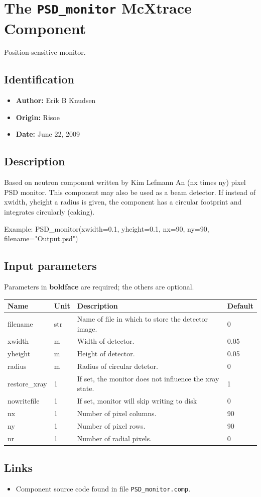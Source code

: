 \section{The \texttt{PSD\_monitor} McXtrace Component}
Position-sensitive monitor.

\subsection*{Identification}
\begin{itemize}
  \item \textbf{Author:} Erik B Knudsen
  \item \textbf{Origin:} Risoe
  \item \textbf{Date:} June 22, 2009
\end{itemize}

\subsection*{Description}
Based on neutron component written by Kim Lefmann An (nx times ny) pixel PSD monitor. This component may also be used as a beam detector. If instead of xwidth, yheight a radius is given, the component has a circular footprint and integrates circularly (caking).

Example: PSD\_monitor(xwidth=0.1, yheight=0.1, nx=90, ny=90, filename="Output.psd")

\subsection*{Input parameters}
Parameters in \textbf{boldface} are required; the others are optional.

\begin{longtable}{p{}p{}p{}p{}}
\toprule
\textbf{Name} & \textbf{Unit} & \textbf{Description} & \textbf{Default} \\
\midrule
\endhead
filename & str & Name of file in which to store the detector image. & 0 \\
xwidth & m & Width of detector. & 0.05 \\
yheight & m & Height of detector. & 0.05 \\
radius & m & Radius of circular detetor. & 0 \\
restore\_xray & 1 & If set, the monitor does not influence the xray state. & 1 \\
nowritefile & 1 & If set, monitor will skip writing to disk & 0 \\
nx & 1 & Number of pixel columns. & 90 \\
ny & 1 & Number of pixel rows. & 90 \\
nr & 1 & Number of radial pixels. & 0 \\
\bottomrule
\end{longtable}

\subsection*{Links}
\begin{itemize}
  \item Component source code found in file \texttt{PSD\_monitor.comp}.
\end{itemize}
